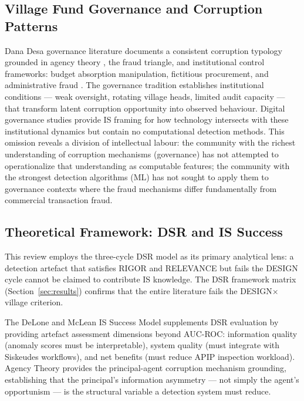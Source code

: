 \documentclass[3p,times,procedia]{elsarticle}
\begin{document}
\subsection{Village Fund Governance and Corruption Patterns}

Dana Desa governance literature documents a consistent corruption typology grounded in agency theory \cite{method_jensen1976}, the fraud triangle, and institutional control frameworks: budget absorption manipulation, fictitious procurement, and administrative fraud \cite{method_kpk2023}. The governance tradition establishes institutional conditions --- weak oversight, rotating village heads, limited audit capacity --- that transform latent corruption opportunity into observed behaviour. Digital governance studies \cite{p013,p016,p039,p044} provide IS framing for how technology intersects with these institutional dynamics but contain no computational detection methods. This omission reveals a division of intellectual labour: the community with the richest understanding of corruption mechanisms (governance) has not attempted to operationalize that understanding as computable features; the community with the strongest detection algorithms (ML) has not sought to apply them to governance contexts where the fraud mechanisms differ fundamentally from commercial transaction fraud.

\subsection{Theoretical Framework: DSR and IS Success}

This review employs the three-cycle DSR model \cite{method_hevner2004} as its primary analytical lens: a detection artefact that satisfies RIGOR and RELEVANCE but fails the DESIGN cycle cannot be claimed to contribute IS knowledge. The DSR framework matrix (Section~\ref{sec:results}) confirms that the entire literature fails the DESIGN$\times$village criterion.

The DeLone and McLean IS Success Model \cite{method_delone2003} supplements DSR evaluation by providing artefact assessment dimensions beyond AUC-ROC: information quality (anomaly scores must be interpretable), system quality (must integrate with Siskeudes workflows), and net benefits (must reduce APIP inspection workload). Agency Theory \cite{method_jensen1976} provides the principal-agent corruption mechanism grounding, establishing that the principal's information asymmetry --- not simply the agent's opportunism --- is the structural variable a detection system must reduce.
\end{document}
